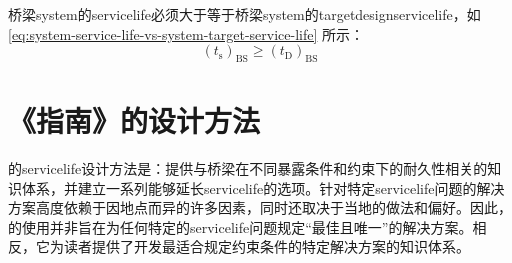 桥梁\gls*{system}的\gls*{servicelife}必须大于等于桥梁\gls*{system}的\gls*{targetdesignservicelife}，如\cref{eq:system-service-life-vs-system-target-service-life} 所示：
\begin{equation}
  \label{eq:system-service-life-vs-system-target-service-life}
  \left( t_\text{s}\right)_\text{BS} \geqslant \left( t_\text{D}\right)_\text{BS}
\end{equation}

\section{《指南》的设计方法}\label{sec:guide-approach}
的\gls*{servicelife}设计方法是：提供与桥梁在不同暴露条件和约束下的耐久性相关的知识体系，并建立一系列能够延长\gls*{servicelife}的选项。针对特定\gls*{servicelife}问题的解决方案高度依赖于因地点而异的许多因素，同时还取决于当地的做法和偏好。因此，的使用并非旨在为任何特定的\gls*{servicelife}问题规定“最佳且唯一”的解决方案。相反，它为读者提供了开发最适合规定约束条件的特定解决方案的知识体系。

